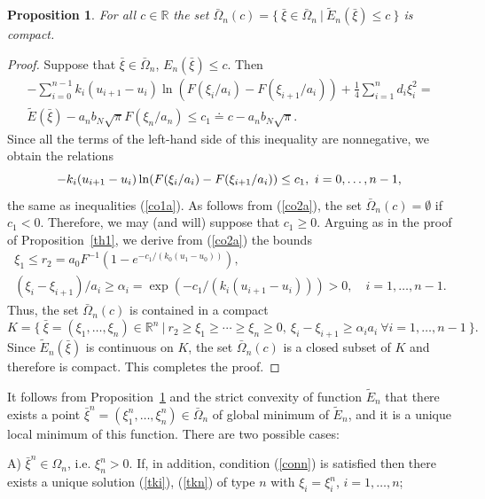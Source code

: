 \documentclass[12pt]{article}
\theoremstyle{plain}
\newtheorem{proposition}{Proposition}[section]
\theoremstyle{definition}
\numberwithin{equation}{section}
\newcommand{\R}{{\mathbb R}}
\begin{document}
\begin{proposition}\label{th4}
For all $c\in\R$ the set $\bar\Omega_n(c)=\{ \ \bar\xi\in\bar\Omega_n \ | \ \tilde E_n(\bar\xi)\le c \ \}$ is compact.
\end{proposition}

\begin{proof}
Suppose that $\bar\xi\in\bar\Omega_n$, $E_n(\bar\xi)\le c$. Then
\begin{align*}
-\sum_{i=0}^{n-1}k_i(u_{i+1}-u_i)\ln (F(\xi_i/a_i)-F(\xi_{i+1}/a_i))+ \frac{1}{4}\sum_{i=1}^n d_i\xi_i^2= \\
\tilde E(\bar\xi)-a_nb_N\sqrt{\pi}F(\xi_n/a_n)\le c_1\doteq c-a_nb_N\sqrt{\pi}.
\end{align*}
Since all the terms of the left-hand side of this inequality are nonnegative, we obtain the relations
\begin{equation}\label{co2a}
-k_i(u_{i+1}-u_i)\ln (F(\xi_i/a_i)-F(\xi_{i+1}/a_i))\le c_1, \ i=0,\ldots,n-1, \\
\end{equation}
the same as inequalities (\ref{co1a}). As follows from (\ref{co2a}),  the set $\bar\Omega_n(c)=\emptyset$ if $c_1<0$. Therefore, we may (and will) suppose that $c_1\ge 0$. Arguing as in the proof of Proposition~\ref{th1}, we derive from (\ref{co2a}) the bounds
\begin{align*}
\xi_1\le r_2=a_0F^{-1}(1-e^{-c_1/(k_0(u_1-u_0))}), \\
(\xi_i-\xi_{i+1})/a_i\ge \alpha_i=\exp(-c_1/(k_i(u_{i+1}-u_i)))>0, \quad i=1,\ldots,n-1.
\end{align*}
Thus, the set $\bar\Omega_n(c)$ is contained in a compact
\[
K=\{ \ \bar\xi=(\xi_1,\ldots,\xi_n)\in\R^n \ | \ r_2\ge\xi_1\ge\cdots\ge\xi_n\ge 0, \ \xi_i-\xi_{i+1}\ge\alpha_i a_i \ \forall i=1,\ldots,n-1 \ \}.
\]
Since $\tilde E_n(\bar\xi)$ is continuous on $K$, the set $\bar\Omega_n(c)$ is a closed subset of $K$ and therefore is compact. This completes the proof.
\end{proof}

It follows from Proposition~\ref{th4} and the strict convexity of function $\tilde E_n$ that there exists a point
$\bar\xi^n=(\xi_1^n,\ldots,\xi_n^n)\in\bar\Omega_n$ of global minimum of $\tilde E_n$, and it is a unique local minimum of this function. There are two possible cases:

A) $\bar\xi^n\in\Omega_n$, i.e. $\xi_n^n>0$. If, in addition, condition (\ref{conn}) is satisfied then there exists a unique solution (\ref{tki}), (\ref{tkn}) of type $n$
with $\xi_i=\xi_i^n$, $i=1,\ldots,n$;
\end{document}
